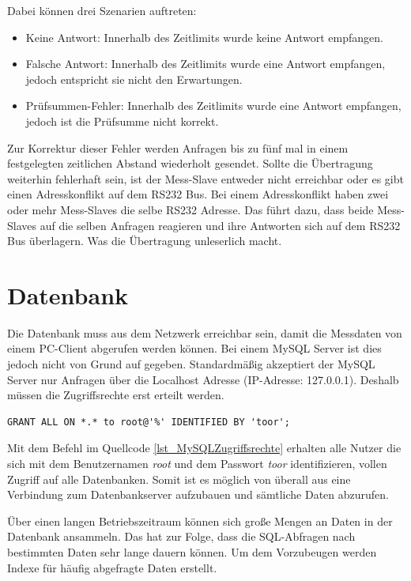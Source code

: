Dabei können drei Szenarien auftreten:
\begin{itemize}
\item Keine Antwort: Innerhalb des Zeitlimits wurde keine Antwort empfangen.
\item Falsche Antwort: Innerhalb des Zeitlimits wurde eine Antwort empfangen, jedoch entspricht sie nicht den Erwartungen.
\item Prüfsummen-Fehler: Innerhalb des Zeitlimits wurde eine Antwort empfangen, jedoch ist die Prüfsumme nicht korrekt.
\end{itemize}

Zur Korrektur dieser Fehler werden Anfragen bis zu fünf mal in einem festgelegten zeitlichen Abstand wiederholt gesendet. Sollte die Übertragung weiterhin fehlerhaft sein, ist der Mess-Slave entweder nicht erreichbar oder es gibt einen Adresskonflikt auf dem RS232 Bus. Bei einem Adresskonflikt haben zwei oder mehr Mess-Slaves die selbe RS232 Adresse. Das führt dazu, dass beide Mess-Slaves auf die selben Anfragen reagieren und ihre Antworten sich auf dem RS232 Bus überlagern. Was die Übertragung unleserlich macht.




\section{Datenbank}

Die Datenbank muss aus dem Netzwerk erreichbar sein, damit die Messdaten von einem PC-Client abgerufen werden können. Bei einem MySQL Server ist dies jedoch nicht von Grund auf gegeben. Standardmäßig akzeptiert der MySQL Server nur Anfragen über die Localhost Adresse (IP-Adresse: 127.0.0.1). Deshalb müssen die Zugriffsrechte erst erteilt werden.\\

\begin{lstlisting}[caption={MySQL Zugriffsrechte},label=lst_MySQLZugriffsrechte]
GRANT ALL ON *.* to root@'%' IDENTIFIED BY 'toor';
\end{lstlisting}

Mit dem Befehl im Quellcode \ref{lst_MySQLZugriffsrechte} erhalten alle Nutzer die sich mit dem Benutzernamen \textit{root} und dem Passwort \textit{toor} identifizieren, vollen Zugriff auf alle Datenbanken. Somit ist es möglich von überall aus eine Verbindung zum Datenbankserver aufzubauen und sämtliche Daten abzurufen.\ 

Über einen langen Betriebszeitraum können sich große Mengen an Daten in der Datenbank ansammeln. Das hat zur Folge, dass die SQL-Abfragen nach bestimmten Daten sehr lange dauern können. Um dem Vorzubeugen werden Indexe für häufig abgefragte Daten erstellt.\\

